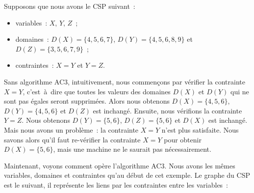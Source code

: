 \begin{example}
\label{example:data:ac3}

Supposons que nous avons le CSP suivant~:
%
\begin{itemize}

\item variables~: $X$, $Y$, $Z$~;

\item domaines~: $D(X) = \{4, 5, 6, 7\}$, $D(Y) = \{4, 5, 6, 8, 9\}$ et $D(Z) =
\{3, 5, 6, 7, 9\}$~;

\item contraintes~: $X = Y$ et $Y = Z$.

\end{itemize}

Sans algorithme AC3, intuitivement, nous commençons par vérifier la contrainte
$X = Y$, c'est~à~dire que toutes les valeurs des domaines $D(X)$ et $D(Y)$ qui
ne sont pas égales seront supprimées. Alors nous obtenons $D(X) = \{4, 5, 6\}$,
$D(Y) = \{4, 5, 6\}$ et $D(Z)$ est inchangé. Ensuite, nous vérifions la
contrainte $Y = Z$. Nous obtenons $D(Y) = \{5, 6\}$, $D(Z) = \{5, 6\}$ et $D(X)$
est inchangé.  Mais nous avons un problème~: la contrainte $X = Y$ n'est plus
satisfaite. Nous savons alors qu'il faut re-vérifier la contrainte $X = Y$ pour
obtenir $D(X) = \{5, 6\}$, mais une machine ne le saurait pas nécessairement.

Maintenant, voyons comment opère l'algorithme AC3. Nous avons les mêmes
variables, domaines et contraintes qu'au début de cet exemple. Le graphe du CSP
est le suivant, il représente les liens par les contraintes entre les
variables~:



\end{example}
